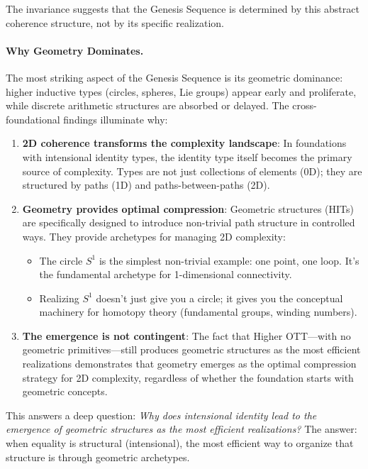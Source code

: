 \documentclass[11pt]{article}
\theoremstyle{definition}
\theoremstyle{remark}
\begin{document}
The invariance suggests that the Genesis Sequence is determined by this abstract coherence structure, not by its specific realization.

\paragraph{Why Geometry Dominates.}

The most striking aspect of the Genesis Sequence is its geometric dominance: higher inductive types (circles, spheres, Lie groups) appear early and proliferate, while discrete arithmetic structures are absorbed or delayed. The cross-foundational findings illuminate why:

\begin{enumerate}
\item \textbf{2D coherence transforms the complexity landscape}: In foundations with intensional identity types, the identity type itself becomes the primary source of complexity. Types are not just collections of elements (0D); they are structured by paths (1D) and paths-between-paths (2D).

\item \textbf{Geometry provides optimal compression}: Geometric structures (HITs) are specifically designed to introduce non-trivial path structure in controlled ways. They provide archetypes for managing 2D complexity:
\begin{itemize}
\item The circle $S^1$ is the simplest non-trivial example: one point, one loop. It's the fundamental archetype for 1-dimensional connectivity.
\item Realizing $S^1$ doesn't just give you a circle; it gives you the conceptual machinery for homotopy theory (fundamental groups, winding numbers).
\end{itemize}

\item \textbf{The emergence is not contingent}: The fact that Higher OTT---with no geometric primitives---still produces geometric structures as the most efficient realizations demonstrates that geometry emerges as the optimal compression strategy for 2D complexity, regardless of whether the foundation starts with geometric concepts.
\end{enumerate}

This answers a deep question: \emph{Why does intensional identity lead to the emergence of geometric structures as the most efficient realizations?} The answer: when equality is structural (intensional), the most efficient way to organize that structure is through geometric archetypes.
\end{document}
